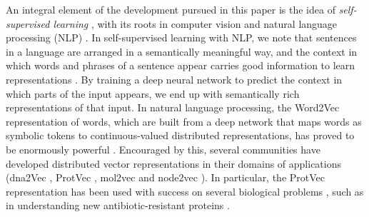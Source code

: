 \documentclass[10pt,journal,compsoc,twoside]{IEEEtran}
\begin{document}
An integral element of the development pursued in this paper is the idea of \textit{self-supervised learning} \cite{representation-learning}, with its roots in computer vision \cite{imagenet_2015} and natural language processing (NLP) \cite{nlp_fundamentals}. In self-supervised learning with NLP, we note that sentences in a language are arranged in a semantically meaningful way, and the context in which words and phrases of a sentence appear carries good information to learn representations \cite{representation-learning}. By training a deep neural network to predict the context in which parts of the input appears, we end up with semantically rich representations of that input. In natural language processing, the Word2Vec \cite{mikolov2013-original} representation of words, which are built from a deep network that maps words as symbolic tokens to continuous-valued distributed representations, has proved to be enormously powerful \cite{mikolov2013_2nd}. Encouraged by this, several communities have developed distributed vector representations in their domains of applications (dna2Vec \cite{dna2vec}, ProtVec \cite{protvec}, mol2vec \cite{mol2vec} and node2vec \cite{node2vec}). In particular, the ProtVec representation has been used with success on several biological problems \cite{protvec} \cite{tape}, such as in understanding new antibiotic-resistant proteins \cite{tape}.
\end{document}
